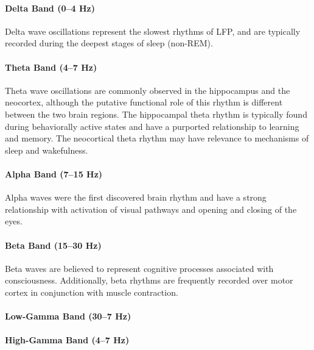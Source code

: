 \paragraph{Delta Band (0--4 Hz)}
Delta wave oscillations represent the slowest rhythms of LFP, and are typically recorded during the deepest stages of sleep (non-REM).

\paragraph{Theta Band (4--7 Hz)}
Theta wave oscillations are commonly observed in the hippocampus and the neocortex, although the putative functional role of this rhythm is different between the two brain regions. The hippocampal theta rhythm is typically found during behaviorally active states and have a purported relationship to learning and memory. The neocortical theta rhythm may have relevance to mechanisms of sleep and wakefulness.

\paragraph{Alpha Band (7--15 Hz)}
Alpha waves were the first discovered brain rhythm and have a strong relationship with activation of visual pathways and opening and closing of the eyes. 

\paragraph{Beta Band (15--30 Hz)}
Beta waves are believed to represent cognitive processes associated with consciousness. Additionally, beta rhythms are frequently recorded over motor cortex in conjunction with muscle contraction.

\paragraph{Low-Gamma Band (30--7 Hz)}

\paragraph{High-Gamma Band (4--7 Hz)} 













